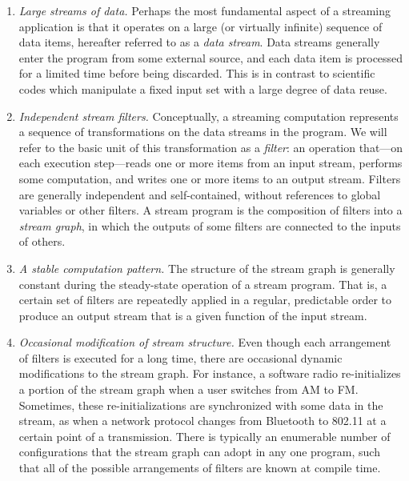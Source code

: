 \documentclass[final]{ijpp}
\begin{document}
\begin{enumerate}
\item \emph{Large streams of data.}  Perhaps the most fundamental
  aspect of a streaming application is that it operates on a large (or
  virtually infinite) sequence of data items, hereafter referred to as
  a \emph{data stream}.  Data streams generally enter the program from
  some external source, and each  data item is processed for a limited
  time  before being  discarded.  This  is in  contrast  to scientific
  codes which  manipulate a  fixed input set  with a large  degree of
  data reuse.

\item \emph{Independent stream filters.}  Conceptually, a streaming
  computation  represents a  sequence of  transformations on  the data
  streams in  the program.  We  will refer to  the basic unit  of this
  transformation  as  a  \emph{filter}:  an operation  that---on  each
  execution  step---reads one  or  more items  from  an input  stream,
  performs some computation, and writes one or more items to an output
  stream.   Filters  are  generally  independent  and  self-contained,
  without references  to global variables or other  filters.  A stream
  program is the composition of filters into a \emph{stream graph}, in
  which the  outputs of  some filters are  connected to the  inputs of
  others.
  
\item \emph{A stable computation pattern.}  The structure of the
  stream graph is generally constant during the steady-state operation
  of  a  stream  program.  That  is,  a  certain  set of  filters  are
  repeatedly  applied in a  regular, predictable  order to  produce an
  output stream that is a given function of the input stream.
  
\item \emph{Occasional modification of stream structure.}  Even though
  each arrangement of  filters is executed for a  long time, there are
  occasional dynamic modifications to the stream graph.  For instance,
  a software radio re-initializes a portion of the stream graph when a
  user switches  from AM  to FM.  Sometimes,  these re-initializations
  are synchronized  with some  data in the  stream, as when  a network
  protocol changes  from Bluetooth to 802.11  at a certain  point of a
  transmission.    There  is   typically  an   enumerable   number  of
  configurations that the  stream graph can adopt in  any one program,
  such that all  of the possible arrangements of  filters are known at
  compile time.
  

\end{enumerate}
\end{document}
